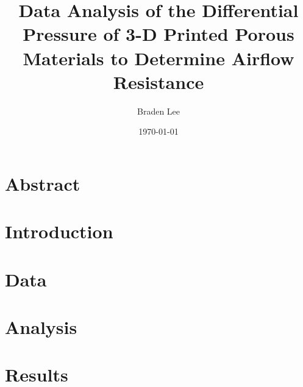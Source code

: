 \documentclass[11pt]{article}
\author{Braden Lee}
\title{Data Analysis of the Differential Pressure of 3-D Printed Porous Materials to Determine 
Airflow Resistance}
\date{\today}
\begin{document}
\maketitle 

\section{Abstract}


\section{Introduction}


\section{Data}


\section{Analysis}


\section{Results}




\end{document}
